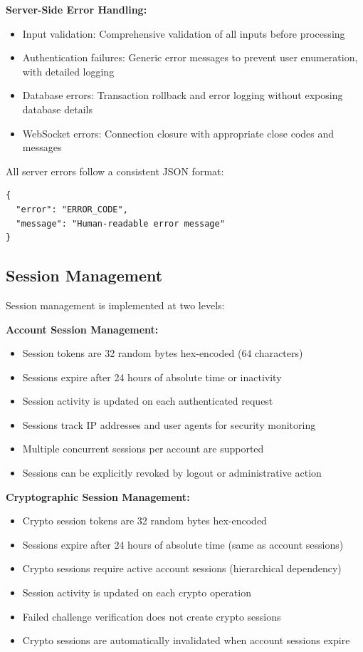 \documentclass[12pt,a4paper,openany]{book}
\begin{document}
\textbf{Server-Side Error Handling:}
\begin{itemize}
\item Input validation: Comprehensive validation of all inputs before processing
\item Authentication failures: Generic error messages to prevent user enumeration, with detailed logging
\item Database errors: Transaction rollback and error logging without exposing database details
\item WebSocket errors: Connection closure with appropriate close codes and messages
\end{itemize}

All server errors follow a consistent JSON format:
\begin{verbatim}
{
  "error": "ERROR_CODE",
  "message": "Human-readable error message"
}
\end{verbatim}

\subsection{Session Management}

Session management is implemented at two levels:

\textbf{Account Session Management:}
\begin{itemize}
\item Session tokens are 32 random bytes hex-encoded (64 characters)
\item Sessions expire after 24 hours of absolute time or inactivity
\item Session activity is updated on each authenticated request
\item Sessions track IP addresses and user agents for security monitoring
\item Multiple concurrent sessions per account are supported
\item Sessions can be explicitly revoked by logout or administrative action
\end{itemize}

\textbf{Cryptographic Session Management:}
\begin{itemize}
\item Crypto session tokens are 32 random bytes hex-encoded
\item Sessions expire after 24 hours of absolute time (same as account sessions)
\item Crypto sessions require active account sessions (hierarchical dependency)
\item Session activity is updated on each crypto operation
\item Failed challenge verification does not create crypto sessions
\item Crypto sessions are automatically invalidated when account sessions expire
\end{itemize}
\end{document}
